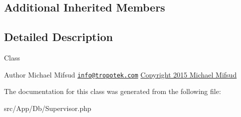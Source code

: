 \subsection*{Additional Inherited Members}


\subsection{Detailed Description}
Class

\begin{DoxyAuthor}{Author}
Michael Mifsud \href{mailto:info@tropotek.com}{\tt info@tropotek.\+com} \hyperlink{}{Copyright 2015 Michael Mifsud }
\end{DoxyAuthor}


The documentation for this class was generated from the following file\+:\begin{DoxyCompactItemize}
\item 
src/\+App/\+Db/Supervisor.\+php\end{DoxyCompactItemize}
